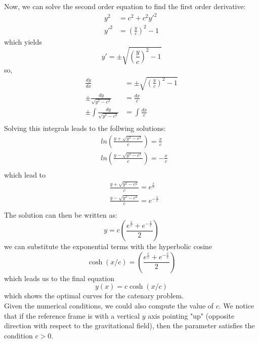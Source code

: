 Now, we can solve the second order equation to find the first order derivative:
\begin{align}
    y^2 &= c^2 +c^2 y'^2 \\
    y'^2 &= \left( \frac{y}{c} \right) ^2 - 1
\end{align}
which yields
\begin{equation}
    y' = \pm \sqrt{ \left( \frac{y}{c} \right)^2 - 1}
\end{equation}
so,
\begin{align}
    \frac{dy}{dx} &= \pm \sqrt{\left( \frac{y}{c} \right) ^2 - 1} \\
    \pm \frac{dy}{\sqrt{y^2 - c^2}} &= \frac{dx}{c} \\
    \pm \int \frac{dy}{\sqrt{y^2 - c^2}} &= \int \frac{dx}{c} \\
\end{align}
Solving this integrals leads to the follwing solutions:
\begin{align}
    &ln \left( \frac{y + \sqrt{y^2 - c^2}}{c} \right) = \frac{x}{c} \\
    &ln \left( \frac{y - \sqrt{y^2 - c^2}}{c} \right) = - \frac{x}{c} \\
\end{align}
which lead to
\begin{align}
    &\frac{y + \sqrt{y^2 - c^2}}{c} = e^{\frac{x}{c}} \\
    &\frac{y - \sqrt{y^2 - c^2}}{c} = e^{-\frac{x}{c}} \\
\end{align}
The solution can then be written as:
\begin{equation}
    y = c \left( \frac{e^{\frac{x}{c}} + e^{-\frac{x}{c}}}{2} \right)
\end{equation}
we can substitute the exponential terms with the hyperbolic cosine
\begin{equation}
    \cosh(x/c) = \left( \frac{e^{\frac{x}{c}} + e^{-\frac{x}{c}}}{2} \right)
\end{equation}
which leads us to the final equation
\begin{equation}
    y(x) = c \cosh(x/c)
\end{equation}
which shows the optimal curves for the catenary problem.\\
Given the numerical conditions, we could also compute the value of $c$. We notice that if the reference frame is with a vertical $y$ axis pointing "up" (opposite direction with respect to the gravitational field), then the parameter satisfies the condition $c > 0$.
\QEDB


